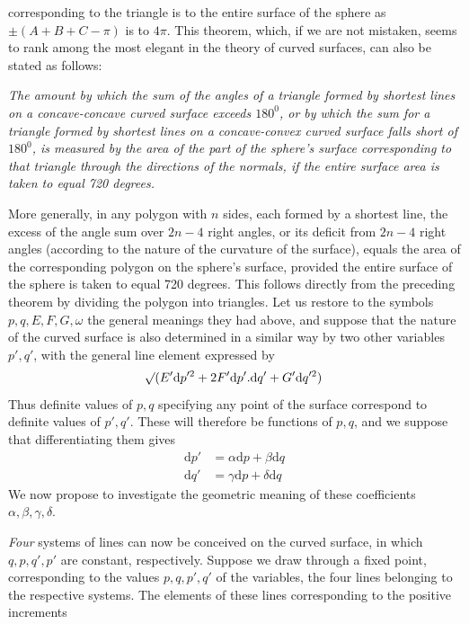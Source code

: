 %
corresponding to the triangle is to the entire surface of the sphere as \(\pm(A+B+C-\pi)\) is to \(4\pi\). This theorem, which, if we are not mistaken, seems to rank among the most elegant in the theory of curved surfaces, can also be stated as follows:

\textit{The amount by which the sum of the angles of a triangle formed by shortest lines on a concave-concave curved surface exceeds \(180^0\), or by which the sum for a triangle formed by shortest lines on a concave-convex curved surface falls short of \(180^0\), is measured by the area of the part of the sphere’s surface corresponding to that triangle through the directions of the normals, if the entire surface area is taken to equal 720 degrees.}

More generally, in any polygon with \(n\) sides, each formed by a shortest line, the excess of the angle sum over \(2n-4\) right angles, or its deficit from \(2n-4\) right angles (according to the nature of the curvature of the surface), equals the area of the corresponding polygon on the sphere’s surface, provided the entire surface of the sphere is taken to equal 720 degrees. This follows directly from the preceding theorem by dividing the polygon into triangles.
Let us restore to the symbols \(p,q,E,F,G,\omega\) the general meanings they had above, and suppose that the nature of the curved surface is also determined in a similar way by two other variables \(p',q'\), with the general line element expressed by
\[
\mathord{{}^{}\!\surd}(E'\mathrm{d}p'^2+2F'\mathrm{d}p'\mathord{.}\mathrm{d}q'+G'\mathrm{d}q'^2)
\]
Thus definite values of \(p,q\) specifying any point of the surface correspond to definite values of \(p',q'\). These will therefore be functions of \(p,q\), and we suppose that differentiating them gives
\[
\begin{aligned}
\mathrm{d}p'&=\alpha\mathrm{d}p+\beta\mathrm{d}q\\
\mathrm{d}q'&=\gamma\mathrm{d}p+\delta\mathrm{d}q
\end{aligned}
\]
We now propose to investigate the geometric meaning of these coefficients \(\alpha,\beta,\gamma,\delta\).

\textit{Four} systems of lines can now be conceived on the curved surface, in which \(q,p,q',p'\) are constant, respectively. Suppose we draw through a fixed point, corresponding to the values \(p,q,p',q'\) of the variables, the four lines belonging to the respective systems. The elements of these lines corresponding to the positive increments
